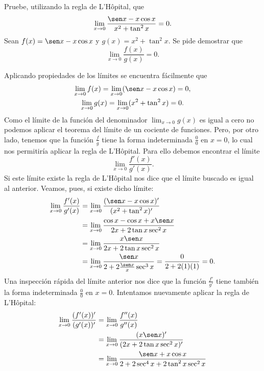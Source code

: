 \begin{exemplo}[Solución]{%
Pruebe, utilizando la regla de L'Hôpital, que
\begin{equation*}
	\lim_{x \to 0}\frac{\sen x-x\cos x}{x^2+\tan^2x}=0.
\end{equation*}
}%
Sean $f(x)= \sen x-x\cos x$ y $g(x)=x^2+\tan^2x$. Se pide demostrar que
\begin{equation*}
	\lim_{x \to 0}\frac{f(x)}{g(x)}=0.
\end{equation*}


Aplicando propiedades de los límites se encuentra fácilmente que
\begin{gather*}
\lim_{x \to 0}f(x) = \lim_{x \to 0}(\sen x-x\cos x)=0,\\
\lim_{x \to 0}g(x) = \lim_{x \to 0}(x^2+\tan^2x)=0.
\end{gather*}
Como el límite de la función del denominador $\displaystyle\lim_{x \to 0}g(x)$ es igual a cero no podemos
aplicar el teorema del límite de un cociente de funciones. Pero, por otro lado, tenemos que la
función $\frac{f}{g}$ tiene la forma indeterminada $\frac{0}{0}$ en $x=0$, lo cual nos permitiría
aplicar la regla de L'Hôpital. Para ello debemos encontrar el límite
\begin{equation*}
	\lim_{x \to 0}\frac{f'(x)}{g'(x)}.
\end{equation*}
Si este límite existe la regla de L'Hôpital nos dice que el límite buscado es igual al anterior.
Veamos, pues, si existe dicho límite:
\begin{align*}
	\lim_{x \to 0}\frac{f'(x)}{g'(x)}&= \lim_{x \to 0}\frac{(\sen x-x\cos x)'}{(x^2+\tan^2x)'}\\
&=\lim_{x \to 0}\frac{\cos x-\cos x+x\sen x}{2x+2\tan x\sec^2x}\\
 &= \lim_{x \to 0}\frac{x\sen x}{2x+2\tan x\sec^2x}\\
 &{}=\lim_{x\to 0}\frac{\sen x}{2+2\frac{\sen x}{x}\sec^3 x}=\frac{0}{2+2(1)(1)}=0.
\end{align*}
Una inspección rápida del límite anterior nos dice que la función $\frac{f'}{g'}$ tiene también la
forma indeterminada $\frac{0}{0}$ en $x=0$. Intentamos nuevamente aplicar la regla de L'Hôpital:
\begin{align*}
	\lim_{x \to 0}\frac{(f'(x))'}{(g'(x))'}&= \lim_{x \to 0}\frac{f''(x)}{g''(x)}\\
&=  \lim_{x \to 0}\frac{(x\sen x)'}{(2x+2\tan x\sec^2x)'}\\
 &= \lim_{x \to 0}\frac{\sen x+x\cos x}{2+2\sec^4 x+2\tan^2 x \sec^2 x}\\

\end{align*}
\end{exemplo}
